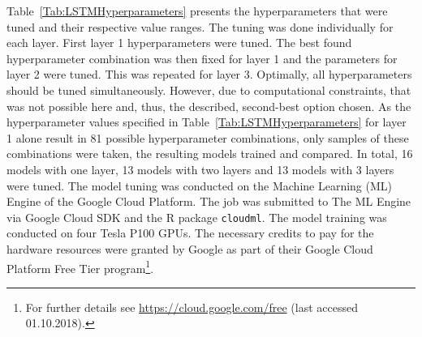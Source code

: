 Table~\ref{Tab:LSTMHyperparameters} presents the hyperparameters that were tuned and their respective value ranges. The tuning was done individually for each layer. First layer 1 hyperparameters were tuned. The best found hyperparameter combination was then fixed for layer 1 and the parameters for layer 2 were tuned. This was repeated for layer 3. Optimally, all hyperparameters should be tuned simultaneously. However, due to computational constraints, that was not possible here and, thus, the described, second-best option chosen. As the hyperparameter values specified in Table~\ref{Tab:LSTMHyperparameters} for layer 1 alone result in 81 possible hyperparameter combinations, only samples of these combinations were taken, the resulting models trained and compared. In total, 16 models with one layer, 13 models with two layers and 13 models with 3 layers were tuned. The model tuning was conducted on the Machine Learning (ML) Engine of the Google Cloud Platform. The job was submitted to The ML Engine via Google Cloud SDK and the R package \texttt{cloudml}. The model training was conducted on four Tesla P100 GPUs. The necessary credits to pay for the hardware resources were granted by Google as part of their Google Cloud Platform Free Tier program\footnote{For further details see \url{https://cloud.google.com/free} (last accessed 01.10.2018).}.

